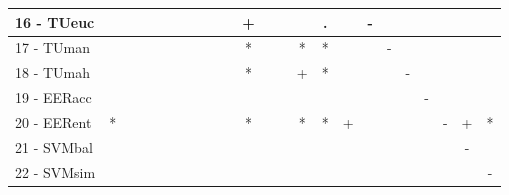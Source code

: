 \begin{table}[h]
\begin{center}
\begin{tabular}{lcc|cc|cc|cc|cc|cc|cc|cc|cc|cc|cc}
16 - TUeuc	&   &   &   &   &   &   &   &   &   & + &   &   &   & . &   & - &   &   &   &   &   &   \\ \hline
17 - TUman	&   &   &   &   &   &   &   &   &   & * &   &   & * & * &   &   & - &   &   &   &   &   \\
18 - TUmah	&   &   &   &   &   &   &   &   &   & * &   &   & + & * &   &   &   & - &   &   &   &   \\ \hline
19 - EERacc	&   &   &   &   &   &   &   &   &   &   &   &   &   &   &   &   &   &   & - &   &   &   \\
20 - EERent	& * &   &   &   &   &   &   &   &   & * &   &   & * & * & + &   &   &   &   & - & + & * \\ \hline
21 - SVMbal	&   &   &   &   &   &   &   &   &   &   &   &   &   &   &   &   &   &   &   &   & - &   \\
22 - SVMsim	&   &   &   &   &   &   &   &   &   &   &   &   &   &   &   &   &   &   &   &   &   & - \\ \hline\end{tabular}
\label{stratsfriedNB}
\end{center}
\end{table}